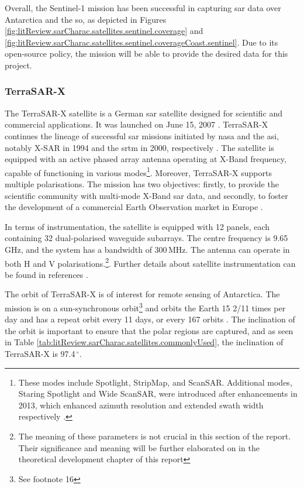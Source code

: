 Overall, the Sentinel-1 mission has been successful in capturing \acs{sar} data over Antarctica and the \acs{so}, as depicted in Figures \ref{fig:litReview.sarCharac.satellites.sentinel.coverage} and \ref{fig:litReview.sarCharac.satellites.sentinel.coverageCoast.sentinel}. Due to its open-source policy, the mission will be able to provide the desired data for this project.

\subsubsection{TerraSAR-X} \label{subsubsec:litReview.sarCharac.satellites.terraSAR}

The TerraSAR-X satellite is a German \acs{sar} satellite designed for scientific and commercial applications. It was launched on June 15, 2007 \cite{Werninghaus2004, Werninghaus2010}. TerraSAR-X continues the lineage of successful \acs{sar} missions initiated by \ac{nasa} and the \ac{asi}, notably X-SAR in 1994 and the \ac{srtm} in 2000, respectively \cite{Werninghaus2010}. The satellite is equipped with an active phased array antenna operating at X-Band frequency, capable of functioning in various modes\footnote{These modes include Spotlight, StripMap, and ScanSAR. Additional modes, Staring Spotlight and Wide ScanSAR, were introduced after enhancements in 2013, which enhanced azimuth resolution and extended swath width respectively \cite{Buckreuss2018}.}. Moreover, TerraSAR-X supports multiple polarisations. The mission has two objectives: firstly, to provide the scientific community with multi-mode X-Band \acs{sar} data, and secondly, to foster the development of a commercial Earth Observation market in Europe \cite{Werninghaus2004}.

In terms of instrumentation, the satellite is equipped with 12 panels, each containing 32 dual-polarised waveguide subarrays. The centre frequency is 9.65\,GHz, and the system has a bandwidth of 300\,MHz. The antenna can operate in both H and V polarisations.\footnote{The meaning of these parameters is not crucial in this section of the report. Their significance and meaning will be further elaborated on in the theoretical development chapter of this report}.\cite{Werninghaus2004} Further details about satellite instrumentation can be found in references \cite{Werninghaus2004, Werninghaus2010}.

The orbit of TerraSAR-X is of interest for remote sensing of Antarctica. The mission is on a sun-synchronous orbit\footnote{See footnote 16} and orbits the Earth 15 2/11 times per day and has a repeat orbit every 11 days, or every 167 orbits \cite{Pitz2010}. The inclination of the orbit is important to ensure that the polar regions are captured, and as seen in Table \ref{tab:litReview.sarCharac.satellites.commonlyUsed}, the inclination of TerraSAR-X is 97.4\,$^{\circ}$. 

